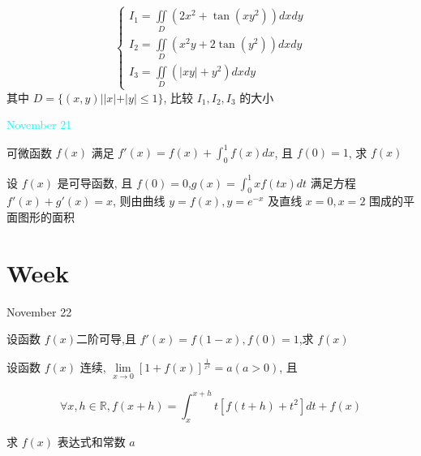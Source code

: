 \begin{example}[][Exam: 37.3.12]
	$$\begin{cases}
		I_{1}=\iint\limits_{D}(2x^{2}+\tan(xy^2))dxdy\\
		I_{2}=\iint\limits_{D}(x^{2}y+2\tan(y^2))dxdy\\
		I_{3}=\iint\limits_{D}(|xy|+y^2)dxdy
	\end{cases}$$
	其中 $D=\{(x,y)||x|+|y|\leq 1\}$, 比较 $I_{1},I_{2},I_{3}$ 的大小
\end{example}

\begin{solution}
	
\end{solution}


\textcolor{cyan}{November 21}

\begin{example}[][Exam: 37.3.13]
	可微函数 $f(x)$ 满足 $f'(x)=f(x)+\int_{0}^{1}f(x)dx$, 且 $f(0)=1$, 求 $f(x)$
\end{example}

\begin{solution}
	
\end{solution}

\begin{example}[][Exam: 37.3.14]
	设 $f(x)$ 是可导函数, 且 $f(0)=0$,$g(x)=\int_{0}^{1}xf(tx)dt$ 满足方程 $f'(x)+g'(x)=x$,
则由曲线 $y=f(x),y=e^{-x}$ 及直线 $x=0,x=2$ 围成的平面图形的面积
\end{example}

\begin{solution}
	
\end{solution}


\section{Week }
\textcolor{purplea}{November 22}

\begin{example}[][Exam: 37.4.1]
	设函数 $f(x)$二阶可导,且 $f'(x)=f(1-x),f(0)=1$,求 $f(x)$
\end{example}

\begin{solution}
	
\end{solution}

\begin{example}[][Exam: 37.4.2]
	设函数 $f(x)$ 连续, $\lim\limits_{x\to 0 }\left[ 1+f(x)\right]^{\frac{1}{x^4}}=a(a>0)$, 且

$$\forall x,h \in \mathbb{R},f(x+h)=\int_{x}^{x+h}t\left[f(t+h)+t^2 \right]dt+f(x)$$

求 $f(x)$ 表达式和常数 $a$
\end{example}

